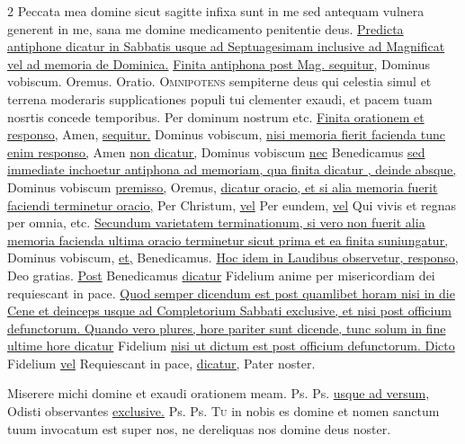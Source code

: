\begin{multicols*}{2}
 Peccata mea domine sicut sagitte infixa sunt in me sed antequam vulnera generent in me, sana me domine medicamento penitentie deus.
\newline \ul{Predicta antiphone dicatur in Sabbatis usque ad Septuagesimam inclusive ad Magnificat vel ad memoria de Dominica.}
\newline \ul{Finita antiphona post Mag. sequitur,} Dominus vobiscum. Oremus. {\color{Red} Oratio.}
\lettrine[lines=2]{\zallmancaps \color{Red} O}{mnipotens} \hypertarget{omnipotens-sempiterne-dom-i-post}{sempiterne} deus qui celestia simul et terrena moderaris supplicationes populi tui clementer exaudi, et pacem tuam nosrtis concede temporibus. Per dominum nostrum etc.
\newline \ul{Finita orationem et responso,} Amen, \ul{sequitur.} Dominus vobiscum, \ul{nisi memoria fierit facienda tunc enim responso,} Amen \ul{non dicatur,} Dominus vobiscum \ul{nec} Benedicamus \ul{sed immediate inchoetur antiphona ad memoriam, qua finita dicatur \Vbar , deinde absque,} Dominus vobiscum \ul{premisso,} Oremus, \ul{dicatur oracio, et si alia memoria fuerit faciendi terminetur oracio,} Per Christum, \ul{vel} Per eundem, \ul{vel} Qui vivis et regnas per omnia, etc. \ul{Secundum varietatem terminationum, si vero non fuerit alia memoria facienda ultima oracio terminetur sicut prima et ea finita suniungatur,} Dominus vobiscum, \ul{et,} Benedicamus. \ul{Hoc idem in Laudibus observetur, responso,} Deo gratias. \ul{Post} Benedicamus \ul{dicatur} Fidelium anime per misericordiam dei requiescant in pace. \ul{Quod semper dicendum est post quamlibet horam nisi in die Cene et deinceps usque ad Completorium Sabbati exclusive, et nisi post officium defunctorum. Quando vero plures, hore pariter sunt dicende, tunc solum in fine ultime hore dicatur} Fidelium \ul{nisi ut dictum est post officium defunctorum. Dicto} Fidelium \ul{vel} Requiescant in pace, \ul{dicatur,} Pater noster.
{\color{Red} }
\par {} Miserere michi domine et exaudi orationem meam. {\color{Red} Ps.}  {\color{Red} Ps.}  \ul{usque ad versum,} Odisti observantes \ul{exclusive.} {\color{Red} Ps.}  {\color{Red} Ps.} 
\lettrine[lines=2]{\zallmancaps \color{Blue} T}{u} in nobis es domine et nomen sanctum tuum invocatum est super nos, ne dereliquas nos domine deus noster.
\begin{responsory-breve}

\end{responsory-breve}
\end{multicols*}
